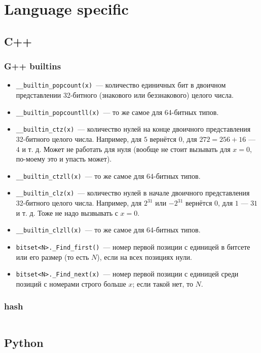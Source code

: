 \section{Language specific}

\subsection{C++}

\subsubsection{G++ builtins}

\begin{itemize}
	\item \texttt{__builtin_popcount(x)}~--- количество единичных бит в двоичном представлении 32-битного (знакового или беззнакового) целого числа.
	\item \texttt{__builtin_popcountll(x)}~--- то же самое для 64-битных типов.
	\item \texttt{__builtin_ctz(x)}~--- количество нулей на конце двоичного представления 32-битного целого числа. Например, для $5$ вернётся $0$, для $272 = 256 + 16$ --- $4$ и т. д. Может не работать для нуля (вообще не стоит вызывать для $x = 0$, по-моему это и упасть может).
	\item \texttt{__builtin_ctzll(x)}~--- то же самое для 64-битных типов.
	\item \texttt{__builtin_clz(x)}~--- количество нулей в начале двоичного представления 32-битного целого числа. Например, для $2^{31}$ или $-2^{31}$ вернётся
		$0$, для $1$ --- $31$ и т. д. Тоже не надо вызвывать с $x = 0$.
	\item \texttt{__builtin_clzll(x)}~--- то же самое для 64-битных типов.

	\item \texttt{bitset<N>._Find_first()}~--- номер первой позиции с единицей в битсете или его размер
		(то есть $N$), если на всех позициях нули.
	\item \texttt{bitset<N>._Find_next(x)}~--- номер первой позиции с единицей среди позиций с номерами строго больше $x$; если такой нет, то $N$.
\end{itemize}

\subsubsection{hash}

\inputminted{C++}{code/hacks.cpp}

\subsection{Python}

\inputminted{Python}{code/python.py}
